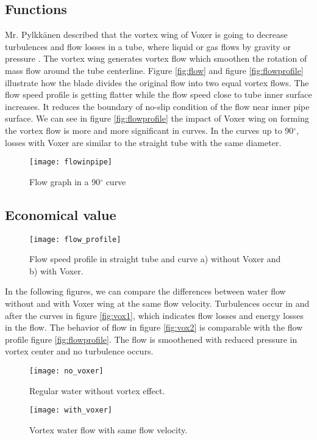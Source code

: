 \subsection{Functions}
Mr. Pylkkänen described that the vortex wing of Voxer is going to decrease turbulences and flow losses in a tube, where liquid or gas flows by gravity or pressure \cite{voxer:article}. The vortex wing generates vortex flow which smoothen the rotation of mass flow around the tube centerline. Figure \vref{fig:flow} and figure \vref{fig:flowprofile} illustrate how the blade divides the original flow into two equal vortex flows. The flow speed profile is getting flatter while the flow speed close to tube inner surface increases. It reduces the boundary of no-slip condition of the flow near inner pipe surface. We can see in figure \vref{fig:flowprofile} the impact of Voxer wing on forming the vortex flow is more and more significant in curves. In the curves up to 90$^{\circ}$, losses with Voxer are similar to the straight tube with the same diameter. 
\begin{figure}[h]
  \centering
  \texttt{[image: flowinpipe]}
  \caption{ Flow graph in a 90$^{\circ}$ curve\cite{voxer:article}}
  \label{fig:flow}
\end{figure}
\subsection{Economical value}
\begin{figure}[h]
  \centering
  \texttt{[image: flow\_profile]}
  \caption{ Flow speed profile in straight tube and curve \newline a) without Voxer and b) with Voxer. \cite{voxer:article}}
  \label{fig:flowprofile}
\end{figure}

In the following figures, we can compare the differences between water flow without and with Voxer wing at the same flow velocity. Turbulences occur in and after the curves in figure \vref{fig:vox1}, which indicates flow losses and energy losses in the flow. The behavior of flow in figure \vref{fig:vox2} is comparable with the flow profile figure \vref{fig:flowprofile}. The flow is smoothened with reduced pressure in vortex center and no turbulence occurs.
\begin{figure}[h]
  \centering
  \texttt{[image: no\_voxer]}
  \caption{ Regular water without vortex effect.\cite{voxer:article}}
  \label{fig:vox1}
\end{figure}
\begin{figure}[h]
  \centering
  \texttt{[image: with\_voxer]}
  \caption{ Vortex water flow with same flow velocity.\cite{voxer:article}}
  \label{fig:vox2}
\end{figure}

